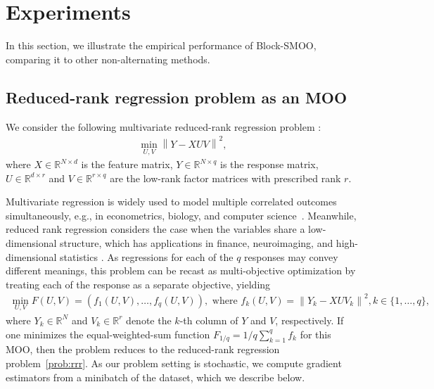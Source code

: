 \documentclass[11pt,a4paper]{article}
\numberwithin{equation}{section}%
\renewcommand{\(}{\left (}
\renewcommand{\)}{\right )}
\begin{document}
\section{Experiments}\label{sec:exp}
 
In this section, we illustrate the empirical performance of Block-SMOO, comparing it to other non-alternating methods. 
\subsection{Reduced-rank regression problem as an MOO}
We consider the following multivariate reduced-rank regression problem \cite{izenman1975reduced,reinsel1998multivariate}:
\begin{align}\label{prob:rrr}
    \min_{U,V} \left\| Y - XUV \right\|^2,
\end{align}
where $X \in \mathbb{R}^{N \times d}$ is the feature matrix, $Y \in \mathbb{R}^{N \times q}$ is the response matrix, $U \in \mathbb{R}^{d \times r}$ and $V \in \mathbb{R}^{r \times q}$ are the low-rank factor matrices with prescribed rank $r$. 



Multivariate regression is widely used to model multiple correlated outcomes simultaneously, e.g., in econometrics, biology, and computer science~\cite{johnson2002applied,reinsel1998multivariate}. Meanwhile, reduced rank regression considers the case when the variables share a low-dimensional structure, which has applications in finance, neuroimaging, and high-dimensional statistics \cite{izenman1975reduced,reinsel1998multivariate,vounou2010discovering}. As regressions for each of the $q$ responses may convey different meanings, this problem can be recast as multi-objective optimization by treating each of the response as a separate objective, yielding
\begin{align*}
    \min_{U,V} F(U,V) = (f_1(U,V), \dots, f_q(U,V)),  \text{ where } f_k(U,V) =
     \left\| Y_k - XUV_k \right\|^2, k \in\{ 1, \dots, q\},
\end{align*}
where $Y_k \in \mathbb{R}^N$ and $V_k \in \mathbb{R}^r$ denote the $k$-th column of $Y$ and $V$, respectively. If one minimizes the equal-weighted-sum function $F_{1/q} = 1/ q \sum_{k=1}^q f_k$ for this MOO, then the problem reduces to the reduced-rank regression problem~\eqref{prob:rrr}. As our problem setting is stochastic, we compute  gradient estimators from a minibatch of the dataset, which we describe below. 
\end{document}
